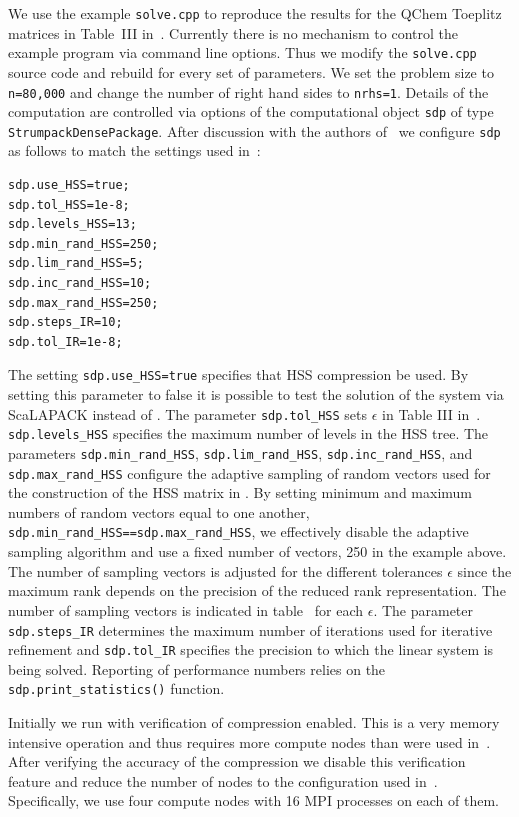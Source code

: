 \documentclass{acmsmall}
\begin{document}
We use the example \verb!solve.cpp! to reproduce the results for
the QChem Toeplitz matrices in Table~III
in~\cite{rouet:strumpack}.  Currently there is no mechanism to
control the example program via command line options.  Thus we
modify the \verb!solve.cpp! source code and rebuild for every set
of parameters.  We set the problem size to \verb!n=80,000! and
change the number of right hand sides to \verb!nrhs=1!.  Details
of the computation are controlled via options of the
computational object \verb!sdp! of type
\verb!StrumpackDensePackage!.  After discussion with the authors
of~\cite{rouet:strumpack} we configure \verb!sdp! as follows to
match the settings used in~\cite{rouet:strumpack}:
\begin{verbatim}
sdp.use_HSS=true;
sdp.tol_HSS=1e-8;
sdp.levels_HSS=13;
sdp.min_rand_HSS=250;
sdp.lim_rand_HSS=5;
sdp.inc_rand_HSS=10;
sdp.max_rand_HSS=250;
sdp.steps_IR=10;
sdp.tol_IR=1e-8;
\end{verbatim}
The setting \verb!sdp.use_HSS=true! specifies that HSS
compression be used.  By setting this parameter to false it is
possible to test the solution of the system via ScaLAPACK instead
of \strumpack{}.  The parameter \verb!sdp.tol_HSS! sets
$\epsilon$ in Table III in~\cite{rouet:strumpack}.
\verb!sdp.levels_HSS! specifies the maximum number of levels in
the HSS tree.  The parameters \verb!sdp.min_rand_HSS!,
\verb!sdp.lim_rand_HSS!, \verb!sdp.inc_rand_HSS!, and
\verb!sdp.max_rand_HSS! configure the adaptive sampling of random
vectors used for the construction of the HSS matrix in
\strumpack{}.  By setting minimum and maximum numbers of random
vectors equal to one another,
\verb!sdp.min_rand_HSS==sdp.max_rand_HSS!, we effectively disable
the adaptive sampling algorithm and use a fixed number of
vectors, 250 in the example above.  The number of sampling
vectors is adjusted for the different tolerances $\epsilon$ since
the maximum rank depends on the precision of the reduced rank
representation.  The number of sampling vectors is indicated in
table~\cite{table:QChemToeplitz} for each $\epsilon$.  The
parameter \verb!sdp.steps_IR! determines the maximum number of
iterations used for iterative refinement and \verb!sdp.tol_IR!
specifies the precision to which the linear system is being
solved.  Reporting of performance numbers relies on the
\verb!sdp.print_statistics()! function.

Initially we run with verification of compression enabled.  This
is a very memory intensive operation and thus requires more
compute nodes than were used in~\cite{rouet:strumpack}.  After
verifying the accuracy of the compression we disable this
verification feature and reduce the number of nodes to the
configuration used in~\cite{rouet:strumpack}.  Specifically, we
use four compute nodes with 16 MPI processes on each of them.
\end{document}
